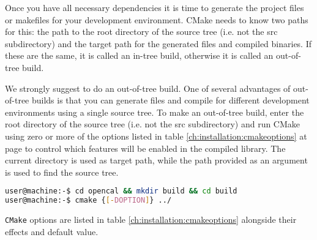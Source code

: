 Once you have all necessary dependencies it is time to generate the project files or makefiles for your development environment. CMake needs to know two paths for this: the path to the root directory of the \texttt{\ocal} source tree (i.e. not the src subdirectory) and the target path for the generated files and compiled binaries. If these are the same, it is called an in-tree build, otherwise it is called an out-of-tree build.

We strongly suggest to do an out-of-tree build.
One of several advantages of out-of-tree builds is that you can generate files and compile for different development environments using a single source tree.
To make an out-of-tree build, enter the root directory of the \texttt{\ocal} source tree (i.e. not the src subdirectory) and run CMake using zero or more of the options listed in table \ref{ch:installation:cmakeoptions}  at page  \pageref{ch:installation:cmakeoptions} to control which features will be enabled in the compiled library. The current directory is used as target path, while the path provided as an argument is used to find the source tree.


 \begin{lstlisting}[language=bash,caption={OpenCAL CMake configuration},label={ch:quickstart:simplebuild}]
user@machine:-$ cd opencal && mkdir build && cd build
user@machine:-$ cmake {[-DOPTION]} ../
\end{lstlisting}


\texttt{CMake} options are listed in table \ref{ch:installation:cmakeoptions} alongside their effects and default value.


